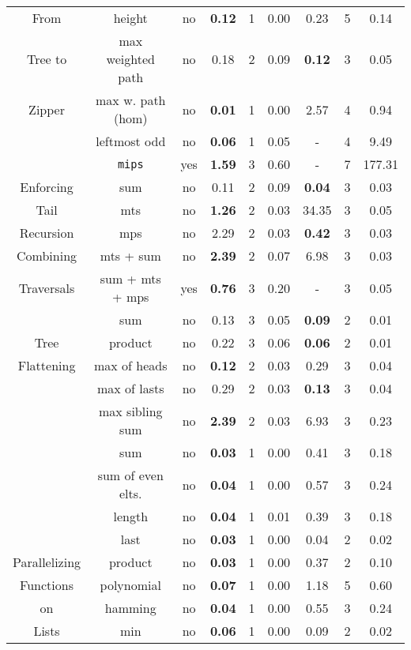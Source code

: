 \begin{table}
{\begin{tabular}[h]{|c|c|c|c|c|c||c|c|c|}
			From  & height & no & {\bfseries 0.12} & 1 & 0.00 & 0.23 & 5 & 0.14\\ 
			Tree to & max weighted path & no & 0.18 & 2 & 0.09 & {\bfseries 0.12} & 3 & 0.05\\ 
			Zipper & max w. path (hom) & no & {\bfseries 0.01} & 1 & 0.00 & 2.57 & 4 & 0.94\\ 
			 & leftmost odd & no & {\bfseries 0.06} & 1 & 0.05 & - & 4 & 9.49\\ 
			 & {\tt mips} & yes & {\bfseries 1.59} & 3 & 0.60 & - & 7 & 177.31\\ 
			\hline
			Enforcing & sum & no & 0.11 & 2 & 0.09 & {\bfseries 0.04} & 3 & 0.03\\ 
			Tail & mts & no & {\bfseries 1.26} & 2 & 0.03 & 34.35 & 3 & 0.05\\ 
			Recursion & mps & no & 2.29 & 2 & 0.03 & {\bfseries 0.42} & 3 & 0.03\\ 
			\hline
			Combining & mts + sum & no & {\bfseries 2.39} & 2 & 0.07 & 6.98 & 3 & 0.03\\ 
			Traversals & sum + mts + mps & yes & {\bfseries 0.76} & 3 & 0.20 & - & 3 & 0.05\\ 
			\hline
			 & sum & no & 0.13 & 3 & 0.05 & {\bfseries 0.09} & 2 & 0.01\\ 
			Tree & product & no & 0.22 & 3 & 0.06 & {\bfseries 0.06} & 2 & 0.01\\ 
			Flattening & max of heads & no & {\bfseries 0.12} & 2 & 0.03 & 0.29 & 3 & 0.04\\ 
			 & max of lasts & no & 0.29 & 2 & 0.03 & {\bfseries 0.13} & 3 & 0.04\\ 
			 & max sibling sum & no & {\bfseries 2.39} & 2 & 0.03 & 6.93 & 3 & 0.23\\ 
			\hline
			 & sum & no & {\bfseries 0.03} & 1 & 0.00 & 0.41 & 3 & 0.18\\ 
			 & sum of even elts. & no & {\bfseries 0.04} & 1 & 0.00 & 0.57 & 3 & 0.24\\ 
			 & length & no & {\bfseries 0.04} & 1 & 0.01 & 0.39 & 3 & 0.18\\ 
			 & last & no & {\bfseries 0.03} & 1 & 0.00 & 0.04 & 2 & 0.02\\ 
			Parallelizing & product & no & {\bfseries 0.03} & 1 & 0.00 & 0.37 & 2 & 0.10\\ 
			Functions & polynomial & no & {\bfseries 0.07} & 1 & 0.00 & 1.18 & 5 & 0.60\\ 
			on & hamming & no & {\bfseries 0.04} & 1 & 0.00 & 0.55 & 3 & 0.24\\ 
			Lists & min & no & {\bfseries 0.06} & 1 & 0.00 & 0.09 & 2 & 0.02\\ 

\end{tabular}}
\end{table}
